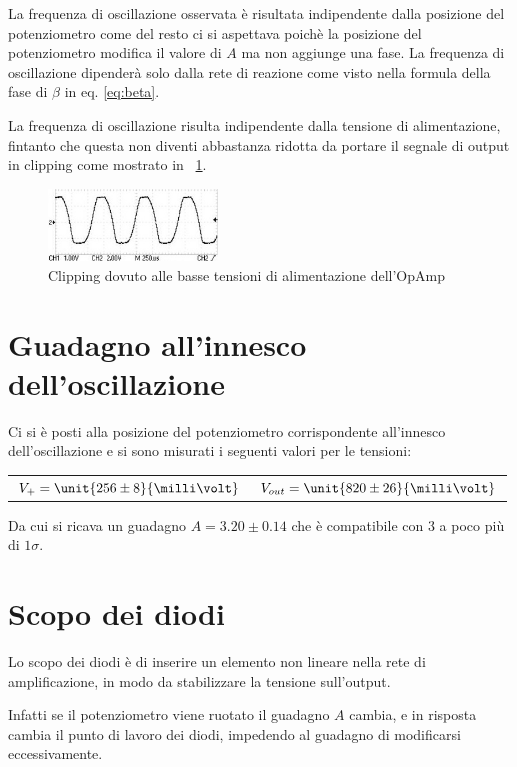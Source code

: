 \documentclass[10pt,a4paper]{article}
\begin{document}
La frequenza di oscillazione osservata è risultata indipendente dalla posizione del potenziometro come del resto ci si aspettava poichè la posizione del potenziometro modifica il valore di $A$ ma non aggiunge una fase. La frequenza di oscillazione dipenderà solo dalla rete di reazione come visto nella formula della fase di $\beta$ in eq. \eqref{eq:beta}.

La frequenza di oscillazione risulta indipendente dalla tensione di alimentazione, fintanto che questa non diventi abbastanza ridotta da portare il segnale di output in clipping come mostrato in \figurename{~\ref{clipping}}.

\begin{figure}[H]
	\centering
	\includegraphics[width=0.4\textwidth]{../oscilloscopio/punto3(clipall)}
	\caption{Clipping dovuto alle basse tensioni di alimentazione dell'OpAmp}
	\label{clipping}
\end{figure}

\section{Guadagno all'innesco dell'oscillazione}

Ci si è posti alla posizione del potenziometro corrispondente all'innesco dell'oscillazione e si sono misurati i seguenti valori per le tensioni:

\begin{table}[H]
	\centering
	\begin{tabular}{cc}
        $ V_+ = \unit{256 \pm 8}{\milli\volt}$  & $V_{out} = \unit{820 \pm 26}{\milli\volt}$
	\end{tabular}
\end{table}

Da cui si ricava un guadagno $A = 3.20 \pm 0.14$ che è compatibile con 3 a poco più di $1\sigma$.

\section{Scopo dei diodi}
Lo scopo dei diodi è di inserire un elemento non lineare nella rete di amplificazione, in modo da stabilizzare la tensione sull'output.

Infatti se il potenziometro viene ruotato il guadagno $A$ cambia, e in risposta cambia il punto di lavoro dei diodi, impedendo al guadagno di modificarsi eccessivamente.
\end{document}
